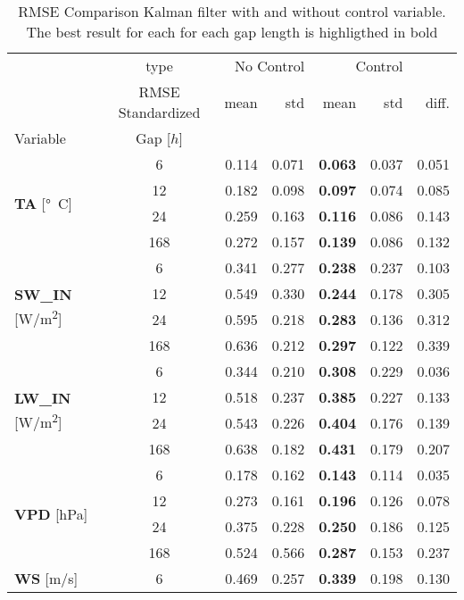 \begin{table}
\centering
\caption{RMSE Comparison Kalman filter with and without control variable. The best result for each for each gap length is highligthed in bold}
\label{control}
\begin{tabular}{p{2.1cm}c|rr|rr|r}
\toprule
 & type & \multicolumn{2}{r}{No Control} & \multicolumn{2}{r}{Control} &  \\
 & RMSE Standardized & mean & std & mean & std & diff. \\
Variable & Gap [$h$] &  &  &  &  &  \\
\midrule
\multirow[c]{4}{*}{\parbox{2.1cm}{\textbf{TA} [\si{°C}]}} & 6 & 0.114 & 0.071 & \bfseries 0.063 & 0.037 & 0.051 \\
 & 12 & 0.182 & 0.098 & \bfseries 0.097 & 0.074 & 0.085 \\
 & 24 & 0.259 & 0.163 & \bfseries 0.116 & 0.086 & 0.143 \\
 & 168 & 0.272 & 0.157 & \bfseries 0.139 & 0.086 & 0.132 \\
\cline{1-7}
\multirow[c]{4}{*}{\parbox{2.1cm}{\textbf{SW\_IN} [\si{W/m^2}]}} & 6 & 0.341 & 0.277 & \bfseries 0.238 & 0.237 & 0.103 \\
 & 12 & 0.549 & 0.330 & \bfseries 0.244 & 0.178 & 0.305 \\
 & 24 & 0.595 & 0.218 & \bfseries 0.283 & 0.136 & 0.312 \\
 & 168 & 0.636 & 0.212 & \bfseries 0.297 & 0.122 & 0.339 \\
\cline{1-7}
\multirow[c]{4}{*}{\parbox{2.1cm}{\textbf{LW\_IN} [\si{W/m^2}]}} & 6 & 0.344 & 0.210 & \bfseries 0.308 & 0.229 & 0.036 \\
 & 12 & 0.518 & 0.237 & \bfseries 0.385 & 0.227 & 0.133 \\
 & 24 & 0.543 & 0.226 & \bfseries 0.404 & 0.176 & 0.139 \\
 & 168 & 0.638 & 0.182 & \bfseries 0.431 & 0.179 & 0.207 \\
\cline{1-7}
\multirow[c]{4}{*}{\parbox{2.1cm}{\textbf{VPD} [\si{hPa}]}} & 6 & 0.178 & 0.162 & \bfseries 0.143 & 0.114 & 0.035 \\
 & 12 & 0.273 & 0.161 & \bfseries 0.196 & 0.126 & 0.078 \\
 & 24 & 0.375 & 0.228 & \bfseries 0.250 & 0.186 & 0.125 \\
 & 168 & 0.524 & 0.566 & \bfseries 0.287 & 0.153 & 0.237 \\
\cline{1-7}
\multirow[c]{4}{*}{\parbox{2.1cm}{\textbf{WS} [\si{m/s}]}} & 6 & 0.469 & 0.257 & \bfseries 0.339 & 0.198 & 0.130 \\

\end{tabular}
\end{table}
